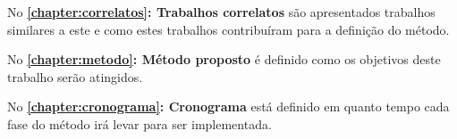 No \textbf{\autoref{chapter:correlatos}: Trabalhos correlatos} são apresentados trabalhos similares a este e como estes trabalhos contribuíram para a definição do método.

No \textbf{\autoref{chapter:metodo}: Método proposto} é definido como os objetivos deste trabalho serão atingidos.

No \textbf{\autoref{chapter:cronograma}: Cronograma} está definido em quanto tempo cada fase do método irá levar para ser implementada.





% 
